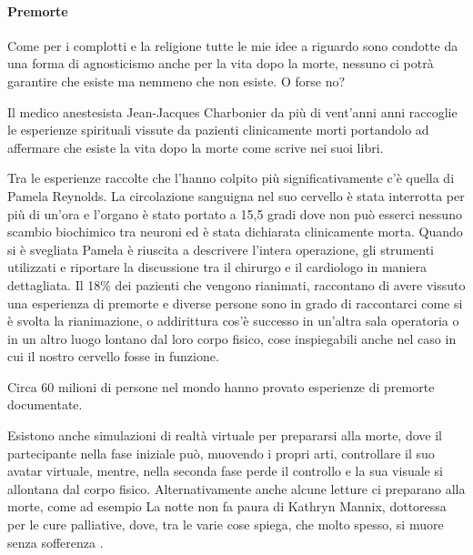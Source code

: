 \documentclass[12pt]{book} %
\begin{document}
\paragraph{Premorte}
Come per i complotti e la religione tutte le mie idee a riguardo sono condotte da una forma di agnosticismo anche per la
vita dopo la morte, nessuno ci potrà garantire che esiste ma nemmeno che non esiste. O forse no? 

Il medico anestesista Jean-Jacques Charbonier da più di vent'anni anni raccoglie le esperienze
spirituali vissute da pazienti clinicamente morti portandolo ad affermare che esiste la vita dopo la morte come scrive
nei suoi
libri.

Tra le esperienze raccolte che l'hanno colpito più significativamente c'è quella di Pamela Reynolds. 
La circolazione sanguigna nel suo cervello è stata interrotta per più di un'ora e l'organo è stato portato a 15,5 gradi dove non può esserci nessuno scambio biochimico tra neuroni ed è stata dichiarata clinicamente morta. Quando si è svegliata Pamela è riuscita a descrivere l'intera operazione, gli strumenti utilizzati e riportare la discussione tra il chirurgo e il cardiologo in maniera dettagliata.
Il 18\% dei pazienti che vengono rianimati, raccontano di avere vissuto una esperienza di premorte e diverse persone sono in grado di raccontarci come si è svolta la rianimazione, o addirittura cos'è successo in un'altra sala operatoria o in un altro luogo lontano dal loro corpo fisico, cose inspiegabili anche nel caso in cui il nostro cervello fosse in funzione.

Circa 60 milioni di persone nel mondo hanno provato esperienze di premorte documentate.

Esistono anche simulazioni di realtà virtuale per prepararsi alla morte, dove il partecipante nella fase iniziale può,
muovendo i propri arti, controllare il suo avatar virtuale, mentre, nella seconda fase perde il controllo e la sua
visuale si allontana dal corpo fisico.
Alternativamente anche alcune letture ci preparano alla morte, come ad esempio La notte non fa paura di Kathryn Mannix, dottoressa per le cure palliative, dove, tra le varie cose spiega, che molto spesso, si muore senza sofferenza .
\end{document}
